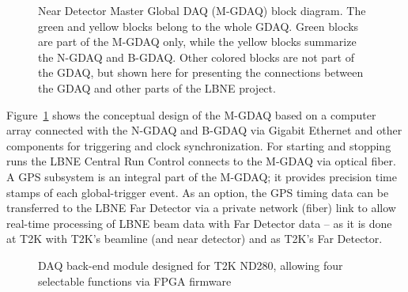 \begin{figure}[htp]
\begin{center}
\caption[Near Detector Master Global DAQ (M-GDAQ) block diagram]{\label{fig:GDAQ_M_Block} Near 
Detector Master Global DAQ (M-GDAQ) block diagram. 
The green and yellow blocks belong to the whole GDAQ.  Green blocks are
part of the M-GDAQ only, while the yellow blocks summarize the N-GDAQ and B-GDAQ.  Other colored blocks are not
part of the GDAQ, but shown here for presenting the connections between
the GDAQ and other parts of the LBNE project.}
\end{center}
\end{figure}

Figure~\ref{fig:GDAQ_M_Block} shows the conceptual design of the M-GDAQ 
based on a computer array connected with the N-GDAQ and B-GDAQ via 
Gigabit Ethernet and other components for triggering and clock 
synchronization. For starting and stopping runs the LBNE Central Run Control 
connects to the M-GDAQ via optical fiber. A GPS subsystem is an 
integral part of the M-GDAQ; it provides precision time stamps of each 
global-trigger event.  As an option, the GPS timing data can be 
transferred to the LBNE Far Detector via a private network (fiber) link 
to allow real-time processing of LBNE beam data with Far Detector data -- 
as it is done at T2K with T2K's beamline (and near detector) and \superk
as T2K's Far Detector. 

\begin{figure}[htp]
\begin{center}
\caption[DAQ back-end module designed for T2K ND280]{\label{fig:T2KBEB} DAQ back-end module designed for T2K ND280, allowing four selectable functions via FPGA firmware %
}
\end{center}
\end{figure}

